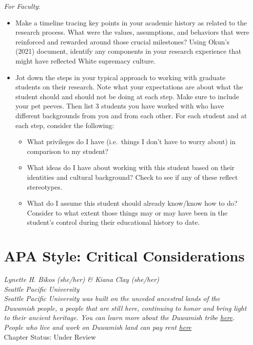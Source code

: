 \documentclass[
  11pt,
]{book}
\providecommand{\tightlist}{%
  \setlength{\itemsep}{0pt}\setlength{\parskip}{0pt}}
\begin{document}
\emph{For Faculty}:

\begin{itemize}
\tightlist
\item
  Make a timeline tracing key points in your academic history as related to the research process. What were the values, assumptions, and behaviors that were reinforced and rewarded around those crucial milestones? Using Okun's (2021) document, identify any components in your research experience that might have reflected White supremacy culture.
\item
  Jot down the steps in your typical approach to working with graduate students on their research. Note what your expectations are about what the student should and should not be doing at each step. Make sure to include your pet peeves. Then list 3 students you have worked with who have different backgrounds from you and from each other. For each student and at each step, consider the following:

  \begin{itemize}
  \tightlist
  \item
    What privileges do I have (i.e.~things I don't have to worry about) in comparison to my student?
  \item
    What ideas do I have about working with this student based on their identities and cultural background? Check to see if any of these reflect stereotypes.
  \item
    What do I assume this student should already know/know how to do? Consider to what extent those things may or may have been in the student's control during their educational history to date.
  \end{itemize}
\end{itemize}

\chapter{APA Style: Critical Considerations}\label{APAstyle}

\emph{Lynette H. Bikos (she/her) \& Kiana Clay (she/her)}\\
\emph{Seattle Pacific University}\\
\emph{Seattle Pacific University was built on the unceded ancestral lands of the Duwamish people, a people that are still here, continuing to honor and bring light to their ancient heritage. You can learn more about the Duwamish tribe \href{https://www.duwamishtribe.org/}{here}. People who live and work on Duwamish land can pay rent \href{https://www.realrentduwamish.org/}{here}}\\
Chapter Status: Under Review
\end{document}
